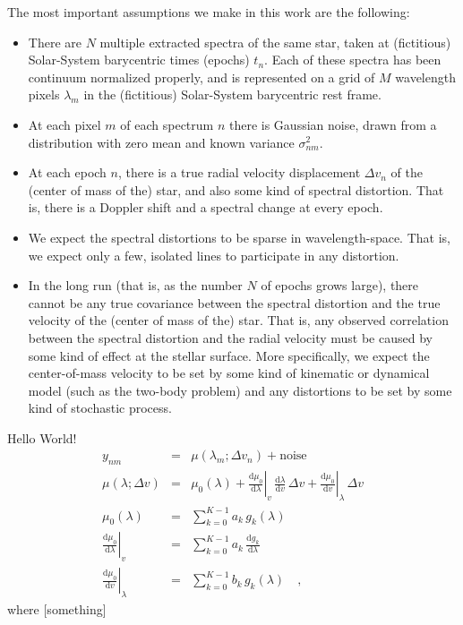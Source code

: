 \documentclass[12pt, letterpaper]{article}
\newcommand{\dd}{\mathrm{d}}
\begin{document}
The most important assumptions we make in this work are the following:
\begin{itemize}\itemsep=0ex
\item There are $N$ multiple extracted spectra of the same star, taken
  at (fictitious) Solar-System barycentric times (epochs) $t_n$. Each
  of these spectra has been continuum normalized properly, and is
  represented on a grid of $M$ wavelength pixels $\lambda_m$ in the
  (fictitious) Solar-System barycentric rest frame.
\item At each pixel $m$ of each spectrum $n$ there is Gaussian noise,
  drawn from a distribution with zero mean and known variance
  $\sigma^2_{nm}$.
\item At each epoch $n$, there is a true radial velocity displacement
  $\Delta v_n$ of the (center of mass of the) star, and also some kind
  of spectral distortion.  That is, there is a Doppler shift and a
  spectral change at every epoch.
\item We expect the spectral distortions to be sparse in
  wavelength-space.  That is, we expect only a few, isolated lines to
  participate in any distortion.
\item In the long run (that is, as the number $N$ of epochs grows
  large), there cannot be any true covariance between the spectral
  distortion and the true velocity of the (center of mass of the)
  star. That is, any observed correlation between the spectral
  distortion and the radial velocity must be caused by some kind of
  effect at the stellar surface. More specifically, we expect the
  center-of-mass velocity to be set by some kind of kinematic or
  dynamical model (such as the two-body problem) and any
  distortions to be set by some kind of stochastic process.
\end{itemize}

Hello World!
\begin{eqnarray}
  y_{nm} &=& \mu(\lambda_m; \Delta v_n) + \mathrm{noise}
  \\
  \mu(\lambda; \Delta v) &=& \mu_0(\lambda)
  + \left.\frac{\dd \mu_0}{\dd\lambda}\right|_{v}\,\frac{\dd\lambda}{\dd v}\,\Delta v
  + \left.\frac{\dd \mu_0}{\dd v}\right|_{\lambda}\,\Delta v
  \\
  \mu_0(\lambda) &=& \sum_{k=0}^{K-1} a_k\,g_k(\lambda)
  \\
  \left.\frac{\dd \mu_0}{\dd\lambda}\right|_{v} &=& \sum_{k=0}^{K-1} a_k\,\frac{\dd g_k}{\dd\lambda}
  \\
  \left.\frac{\dd \mu_0}{\dd v}\right|_{\lambda} &=& \sum_{k=0}^{K-1} b_k\,g_k(\lambda)
  \quad ,
\end{eqnarray}
where [something]
\end{document}
